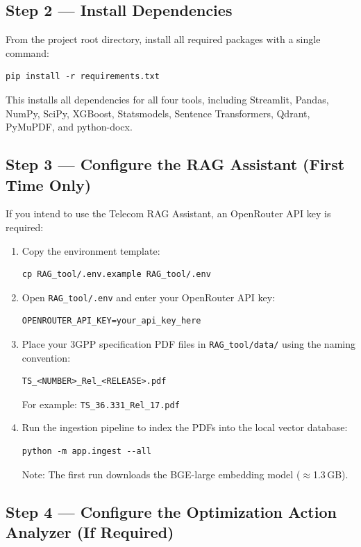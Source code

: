 \subsection{Step 2 — Install Dependencies}

From the project root directory, install all required packages with a single command:

\begin{verbatim}
pip install -r requirements.txt
\end{verbatim}

This installs all dependencies for all four tools, including Streamlit, Pandas, NumPy, SciPy, XGBoost, Statsmodels, Sentence Transformers, Qdrant, PyMuPDF, and python-docx.

\subsection{Step 3 — Configure the RAG Assistant (First Time Only)}

If you intend to use the Telecom RAG Assistant, an OpenRouter API key is required:

\begin{enumerate}
    \item Copy the environment template:
    \begin{verbatim}
cp RAG_tool/.env.example RAG_tool/.env
    \end{verbatim}
    \item Open \texttt{RAG\_tool/.env} and enter your OpenRouter API key:
    \begin{verbatim}
OPENROUTER_API_KEY=your_api_key_here
    \end{verbatim}
    \item Place your 3GPP specification PDF files in \texttt{RAG\_tool/data/} using the naming convention:
    \begin{verbatim}
TS_<NUMBER>_Rel_<RELEASE>.pdf
    \end{verbatim}
    For example: \texttt{TS\_36.331\_Rel\_17.pdf}
    \item Run the ingestion pipeline to index the PDFs into the local vector database:
    \begin{verbatim}
python -m app.ingest --all
    \end{verbatim}
    Note: The first run downloads the BGE-large embedding model ($\approx$1.3\,GB).
\end{enumerate}

\subsection{Step 4 — Configure the Optimization Action Analyzer (If Required)}

